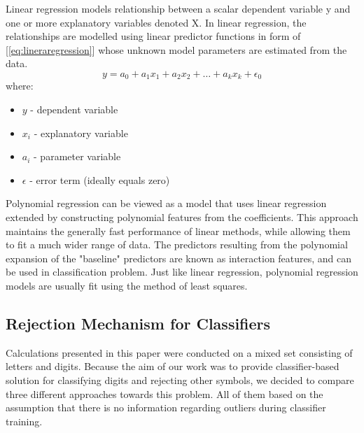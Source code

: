 \documentclass{llncs}
\begin{document}
Linear regression models relationship between a scalar dependent variable y and one or more explanatory variables denoted X. In linear regression, the relationships are modelled using linear predictor functions in form of [\ref{eq:lineraregression}] whose unknown model parameters are estimated from the data.
\begin{equation} \label{eq:lineraregression} y = a_{0} + a_{1}x_{1} + a_{2}x_{2} + \dots + a_{k}x_{k} + \epsilon_{0} \end{equation} where:
\begin{itemize}
	\item $y$ - dependent variable \\
	\item $x_{i}$ - explanatory variable \\
	\item $a_{i}$ - parameter variable \\
	\item $\epsilon$ - error term (ideally equals zero) \\
\end{itemize}

Polynomial regression can be viewed as a model that uses linear regression extended by constructing polynomial features from the coefficients. This approach maintains the generally fast performance of linear methods, while allowing them to fit a much wider range of data. The predictors resulting from the polynomial expansion of the "baseline" predictors are known as interaction features, and can be used in classification problem. Just like linear regression, polynomial regression models are usually fit using the method of least squares.

\subsection{Rejection Mechanism for Classifiers}
\label{sec:rejectionmechanism}
Calculations presented in this paper were conducted on a mixed set consisting of letters and digits. Because the aim of our work was to provide classifier-based solution for classifying digits and rejecting other symbols, we decided to compare three different approaches towards this problem. All of them based on the assumption that there is no information regarding outliers during classifier training. \\
\end{document}
